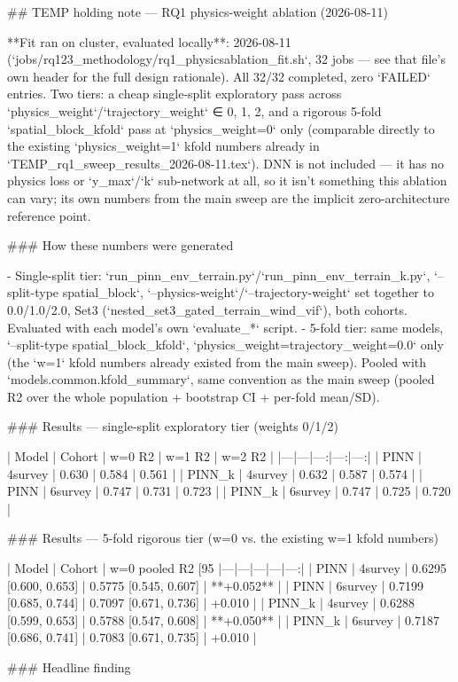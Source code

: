 ## TEMP holding note — RQ1 physics-weight ablation (2026-08-11)

**Fit ran on cluster, evaluated locally**: 2026-08-11
(`jobs/rq123_methodology/rq1_physicsablation_fit.sh`, 32 jobs — see that file's own header for
the full design rationale). All 32/32 completed, zero `FAILED` entries. Two tiers: a cheap
single-split exploratory pass across `physics_weight`/`trajectory_weight` ∈ {0, 1, 2}, and a
rigorous 5-fold `spatial_block_kfold` pass at `physics_weight=0` only (comparable directly to the
existing `physics_weight=1` kfold numbers already in `TEMP_rq1_sweep_results_2026-08-11.tex`).
DNN is not included — it has no physics loss or `y_max`/`k` sub-network at all, so it isn't
something this ablation can vary; its own numbers from the main sweep are the implicit
zero-architecture reference point.

### How these numbers were generated

- Single-split tier: `run_pinn_env_terrain.py`/`run_pinn_env_terrain_k.py`,
  `--split-type spatial_block`, `--physics-weight`/`--trajectory-weight` set together to 0.0/1.0/2.0,
  Set3 (`nested_set3_gated_terrain_wind_vif`), both cohorts. Evaluated with each model's own
  `evaluate_*` script.
- 5-fold tier: same models, `--split-type spatial_block_kfold`, `physics_weight=trajectory_weight=0.0`
  only (the `w=1` kfold numbers already existed from the main sweep). Pooled with
  `models.common.kfold_summary`, same convention as the main sweep (pooled R2 over the whole
  population + bootstrap CI + per-fold mean/SD).

### Results — single-split exploratory tier (weights 0/1/2)

| Model | Cohort | w=0 R2 | w=1 R2 | w=2 R2 |
|---|---|---:|---:|---:|
| PINN | 4survey | 0.630 | 0.584 | 0.561 |
| PINN_k | 4survey | 0.632 | 0.587 | 0.574 |
| PINN | 6survey | 0.747 | 0.731 | 0.723 |
| PINN_k | 6survey | 0.747 | 0.725 | 0.720 |

### Results — 5-fold rigorous tier (w=0 vs. the existing w=1 kfold numbers)

| Model | Cohort | w=0 pooled R2 [95%
|---|---|---|---|---:|
| PINN | 4survey | 0.6295 [0.600, 0.653] | 0.5775 [0.545, 0.607] | **+0.052** |
| PINN | 6survey | 0.7199 [0.685, 0.744] | 0.7097 [0.671, 0.736] | +0.010 |
| PINN_k | 4survey | 0.6288 [0.599, 0.653] | 0.5788 [0.547, 0.608] | **+0.050** |
| PINN_k | 6survey | 0.7187 [0.686, 0.741] | 0.7083 [0.671, 0.735] | +0.010 |

### Headline finding


